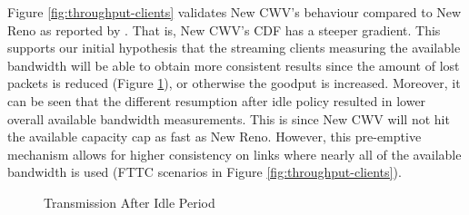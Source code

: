 \documentclass[10pt,sigconf]{acmart}
\begin{document}
Figure \ref{fig:throughput-clients} validates New CWV's behaviour compared to New Reno as reported by \cite{Nazir-2014-performance-evaluation-congestion-window-validation-dash-newcwv}. That is, New CWV's CDF has a steeper gradient. This supports our initial hypothesis that the streaming clients measuring the available bandwidth will be able to obtain more consistent results since the amount of lost packets is reduced (Figure \ref{fig:transmission-after-idle}), or otherwise the goodput is increased. Moreover, it can be seen that the different resumption after idle policy resulted in lower overall available bandwidth measurements. This is since New CWV will not hit the available capacity cap as fast as New Reno. However, this pre-emptive mechanism allows for higher consistency on links where nearly all of the available bandwidth is used (FTTC scenarios in Figure \ref{fig:throughput-clients}).

\begin{figure}
  \centering
    \caption{Transmission After Idle Period}
    \label{fig:transmission-after-idle}
\end{figure}
\end{document}
